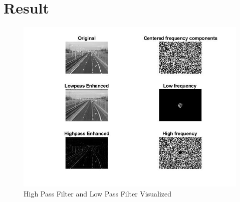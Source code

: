 \documentclass[a4paper,11pt]{article}
\begin{document}
	\section*{Result}
	\begin{figure}[h!]
		\includegraphics[scale=0.6]{result.jpg}
		\caption{High Pass Filter and Low Pass Filter Visualized}
	\end{figure}  
	
\end{document}
